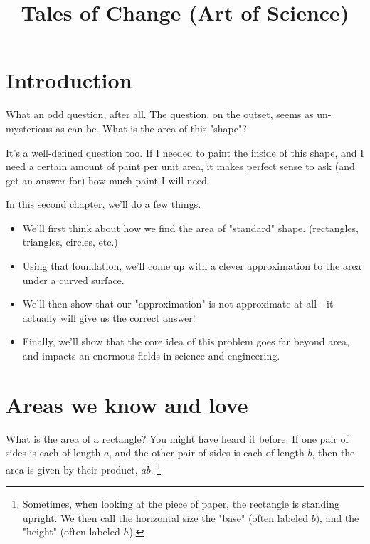 \documentclass{article}
\title{Tales of Change (Art of Science)}
\date{\vspace{-5ex}}
\begin{document}
\maketitle



\section{Introduction}

What an odd question, after all. The question, on the outset, seems as un-mysterious as can be. What is the area of this "shape"? 

It's a well-defined question too. If I needed to paint the inside of this shape, and I need a certain amount of paint per unit area, it makes perfect sense to ask (and get an answer for) how much paint I will need.


In this second chapter, we'll do a few things. 

\begin{itemize}
\item We'll first think about how we find the area of "standard" shape. (rectangles, triangles, circles, etc.)
\item Using that foundation, we'll come up with a clever approximation to the area under a curved surface. 
\item We'll then show that our "approximation" is not approximate at all - it actually will give us the correct answer!
\item Finally, we'll show that the core idea of this problem goes far beyond area, and impacts an enormous fields in science and engineering.
\end{itemize}


\section{Areas we know and love}

What is the area of a rectangle? You might have heard it before. If one pair of sides is each of length $a$, and the other pair of sides is each of length $b$, then the area is given by their product, $ab$. \footnote{Sometimes, when looking at the piece of paper, the rectangle is standing upright. We then call the horizontal size the "base" (often labeled $b$), and the "height" (often labeled $h$).}
\end{document}

